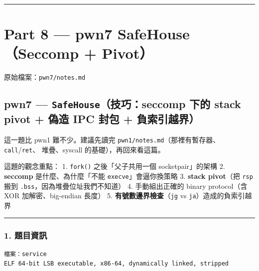 \documentclass[10pt,a4paper]{article}
\renewenvironment{quote}{%
  \begin{mdframed}[linewidth=0pt,innerleftmargin=0pt,innerrightmargin=0pt,
    innerbottommargin=0pt,innertopmargin=0pt,skipabove=0.55em,skipbelow=0.55em,
    leftmargin=0.9em,rightmargin=0.4em,startcode={\color{quotebar}\vrule width 2.6pt},%
    endcode={}]%
  \itshape\color{black}%
}{%
  \end{mdframed}%
}
\begin{document}
\begin{center}\rule{0.5\linewidth}{0.5pt}\end{center}

\section{Part 8 --- pwn7 SafeHouse（Seccomp +
Pivot）}\label{part-8-pwn7-safehouseseccomp-pivot}

\begin{quote}
原始檔案：\texttt{pwn7/\allowbreak{}notes.\allowbreak{}md}
\end{quote}

\subsection{\texorpdfstring{pwn7 --- \texttt{SafeHouse}（技巧：seccomp
下的 stack pivot + 偽造 IPC 封包 +
負索引越界）}{pwn7 --- SafeHouse（技巧：seccomp 下的 stack pivot + 偽造 IPC 封包 + 負索引越界）}}\label{pwn7-safehouseux6280ux5de7seccomp-ux4e0bux7684-stack-pivot-ux507dux9020-ipc-ux5c01ux5305-ux8ca0ux7d22ux5f15ux8d8aux754c}

\begin{quote}
這一題比 pwn1 難不少。建議先讀完
\texttt{pwn1/\allowbreak{}notes.\allowbreak{}md}（那裡有暫存器、\texttt{call}/\texttt{ret}、
堆疊、syscall 的基礎），再回來看這篇。

這題的觀念重點： 1. \texttt{fork()} 之後「父子共用一個
socketpair」的架構 2. \textbf{seccomp} 是什麼、為什麼「不能
\texttt{execve}」會逼你換策略 3. \textbf{stack pivot}（把 \texttt{rsp}
搬到 \texttt{.\allowbreak{}bss}，因為堆疊位址我們不知道） 4. 手動組出正確的 binary
protocol（含 XOR 加解密、big-endian 長度） 5.
\textbf{有號數邊界檢查}（\texttt{jg} vs \texttt{ja}）造成的負索引越界
\end{quote}

\begin{center}\rule{0.5\linewidth}{0.5pt}\end{center}

\subsubsection{1. 題目資訊}\label{ux984cux76eeux8cc7ux8a0a-5}

\begin{Verbatim}[breaklines=true,breakanywhere=true,breakautoindent=false,fontsize=\fontsize{7.0}{9.5}\selectfont]
檔案：service
ELF 64-bit LSB executable, x86-64, dynamically linked, stripped
\end{Verbatim}
\end{document}
